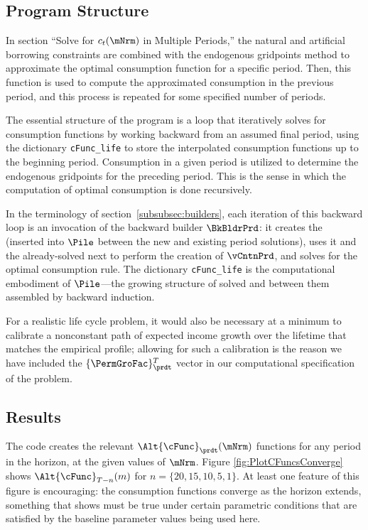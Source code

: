 \documentclass[SolvingMicroDSOPs]{subfiles}
\begin{document}
\subsection{Program Structure}

In section ``Solve for $c_t(\mNrm)$ in Multiple Periods,'' the natural and artificial borrowing constraints are combined with the endogenous gridpoints method to approximate the optimal consumption function for a specific period. Then, this function is used to compute the approximated consumption in the previous period, and this process is repeated for some specified number of periods.

The essential structure of the program is a loop that iteratively solves for consumption functions by working backward from an assumed final period, using the dictionary \texttt{cFunc\_life} to store the interpolated consumption functions up to the beginning period. Consumption in a given period is utilized to determine the endogenous gridpoints for the preceding period. This is the sense in which the computation of optimal consumption is done recursively.

In the terminology of section~\ref{subsubsec:builders}, each iteration of this backward loop is an invocation of the backward builder $\BkBldrPrd$: it creates the {\Cnct} (inserted into $\Pile$ between the new and existing period solutions), uses it and the already-solved next {\interval} to perform the creation of $\vCntnPrd$, and solves for the optimal consumption rule.  The dictionary \texttt{cFunc\_life} is the computational embodiment of $\Pile$---the growing structure of solved {\intervals} and {\Cncts} between them assembled by backward induction.

For a realistic life cycle problem, it would also be necessary at a
minimum to calibrate a nonconstant path of expected income growth over the
lifetime that matches the empirical profile; allowing for such
a calibration is the reason we have included the $\{\PermGroFac\}_{\prdt}^{T}$
vector in our computational specification of the problem.

\hypertarget{results}{}
\subsection{Results}

The code creates the relevant $\Alt{\cFunc}_{\prdt}(\mNrm)$ functions for any period in the horizon, at the given values of $\mNrm$.  Figure \ref{fig:PlotCFuncsConverge} shows $\Alt{\cFunc}_{T-n}(m)$ for $n=\{20,15,10,5,1\}$.  At least one feature of this figure is encouraging: the consumption functions converge as the horizon extends, something that \cite{BufferStockTheory} shows must be true under certain parametric conditions that are satisfied by the baseline parameter values being used here.
\end{document}
